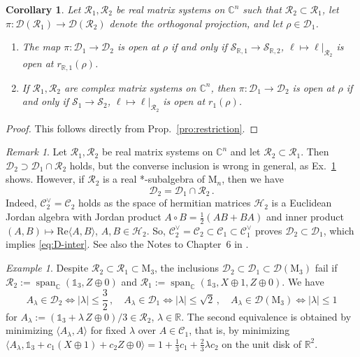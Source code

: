 \documentclass[a4paper,11pt,reqno]{amsart}
\newcommand{\C}{\mathbb{C}}
\newcommand{\R}{\mathbb{R}}
\newcommand{\M}{\mathrm{M}}
\newcommand{\cC}{\mathcal{C}}
\newcommand{\cD}{\mathcal{D}}
\newcommand{\cH}{\mathcal{H}}
\newcommand{\cR}{\mathcal{R}}
\newcommand{\cS}{\mathcal{S}}
\newcommand{\id}{\mathds{1}}
\renewcommand\Re{\mathrm{Re}}
\DeclareMathOperator\spn{span}
\newtheorem{cor}[thm]{Corollary}
\theoremstyle{definition}
\theoremstyle{remark}
\newtheorem{rem}[thm]{Remark}
\newtheorem{exa}[thm]{Example}
\numberwithin{equation}{section}
\begin{document}
%
\begin{cor}\label{cor:restriction}
Let $\cR_1,\cR_2$ be real matrix systems on $\C^n$ such that $\cR_2\subset\cR_1$,
let $\pi:\cD(\cR_1)\to\cD(\cR_2)$ denote the orthogonal projection, and let 
$\rho\in\cD_1$. 
\begin{enumerate}
\item[a)] 
The map $\pi:\cD_1\to\cD_2$ is open at $\rho$ if and only if 
$\cS_{\R,1}\to\cS_{\R,2}$, $\ell\mapsto\ell|_{\cR_2}$ is open at 
$r_{\R,1}(\rho)$.
\item[b)]
If $\cR_1,\cR_2$ are complex matrix systems on $\C^n$, then $\pi:\cD_1\to\cD_2$ 
is open at $\rho$ if and only if $\cS_1\to\cS_2$, $\ell\mapsto\ell|_{\cR_2}$ is 
open at $r_1(\rho)$.
\end{enumerate}
\end{cor}
%
\begin{proof}
This follows directly from Prop.~\ref{pro:restriction}.
\end{proof}
%
\begin{rem}\label{rem:intersection}
Let $\cR_1,\cR_2$ be real matrix systems on $\C^n$ and let $\cR_2\subset\cR_1$. 
Then $\cD_2\supset\cD_1\cap\cR_2$ holds, but the converse inclusion 
is wrong in general, as Ex.~\ref{ex:ex1a} shows. However, if $\cR_2$ is a real 
*-subalgebra of $\M_n$, then we have 
\begin{equation}\label{eq:D-inter}
\cD_2=\cD_1\cap\cR_2\,.
\end{equation}
Indeed, $\cC_2^\vee=\cC_2$ holds \cite[Thm.~III.2.1]{FarautKoranyi1994} as the 
space of hermitian matrices $\cH_2$ is a Euclidean Jordan algebra with Jordan 
product $A\circ B=\frac{1}{2}(AB+BA)$ and inner product 
$(A,B)\mapsto\Re\langle A,B\rangle$, $A,B\in\cH_2$. So,
$\cC_2^\vee=\cC_2\subset\cC_1\subset\cC_1^\vee$ proves $\cD_2\subset\cD_1$, 
which implies \eqref{eq:D-inter}. See also the Notes to Chapter~6 in 
\cite{AlfsenShultz2003}.
\end{rem}
%
\begin{exa}\label{ex:ex1a}
Despite $\cR_2\subset\cR_1\subset\M_3$, the inclusions 
$\cD_2\subset\cD_1\subset\cD(\M_3)$ fail if $\cR_2:=\spn_\C(\id_3,Z\oplus 0)$ 
and $\cR_1:=\spn_\C(\id_3,X\oplus 1,Z\oplus 0)$. We have
\[\textstyle
A_\lambda\in\cD_2\Leftrightarrow|\lambda|\leq\frac{3}{2}\,,
\quad
A_\lambda\in\cD_1\Leftrightarrow|\lambda|\leq\sqrt{2}\,,
\quad
A_\lambda\in\cD(\M_3)\Leftrightarrow|\lambda|\leq 1
\]
for $A_\lambda:=(\id_3+\lambda\,Z\oplus 0)/3\in\cR_2$, $\lambda\in\R$.
The second equivalence is obtained by minimizing $\langle A_\lambda,A\rangle$ 
for fixed $\lambda$ over $A\in\cC_1$, that is, by minimizing 
$\langle A_\lambda,\id_3+c_1(X\oplus 1)+c_2Z\oplus 0\rangle
=1+\frac{1}{3}c_1+\frac{2}{3}\lambda c_2$ 
on the unit disk of $\R^2$.
\end{exa}
%
%
\end{document}
